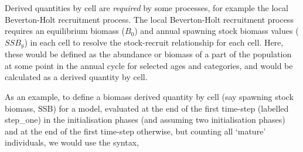 Derived quantities by cell are \emph{required} by some processes, for example the local Beverton-Holt recruitment process. The local Beverton-Holt recruitment process requires an equilibrium biomass ($B_0$) and annual spawning stock biomass values ($SSB_y$) in each cell to resolve the stock-recruit relationship for each cell. Here, these would be defined as the abundance or biomass of a part of the population at some point in the annual cycle for selected ages and categories, and would be calculated as a derived quantity by cell.

As an example, to define a biomass derived quantity by cell (say spawning stock biomass, SSB) for a model, evaluated at the end of the first time-step (labelled step\_one) in the initialisation phases (and assuming two initialisation phases) and at the end of the first time-step otherwise, but counting all `mature' individuals, we would use the syntax,

